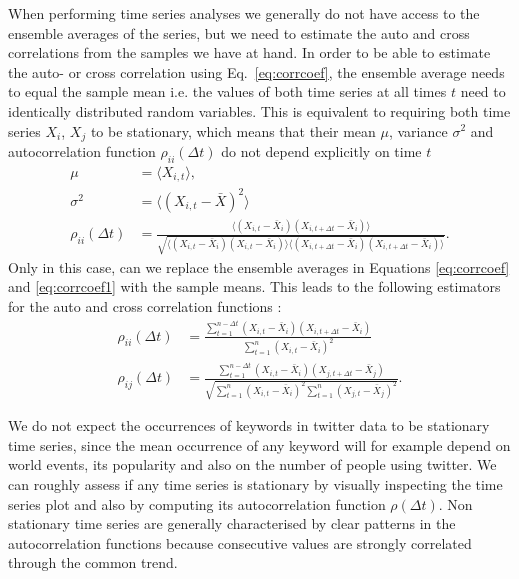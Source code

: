 \documentclass[12pt, a4paper]{article}
\begin{document}
When performing time series analyses we generally do not have access to the ensemble averages of the series, but we need to estimate the auto and cross correlations from the samples we have at hand. In order to be able to estimate the auto- or cross correlation using Eq.~\ref{eq:corrcoef}, the ensemble average needs to equal the sample mean i.e. the values of both time series at all times $t$ need to identically distributed random variables. This is equivalent to requiring both time series $X_{i}$, $X_{j}$ to be stationary, which means that their mean $\mu$, variance $\sigma^{2}$ and autocorrelation function $\rho_{ii}(\Delta t)$ do not depend explicitly on time $t$
\begin{align}
\mu &= \langle X_{i, t} \rangle, \\
\sigma^{2} &=  \langle (X_{i, t}-\bar{X})^{2} \rangle \\
\rho_{ii}(\Delta t) &= \frac{\langle (X_{i, t}-\bar{X}_{i}) (X_{i, t+\Delta t}-\bar{X}_{i}) \rangle}{\sqrt{\langle (X_{i, t}-\bar{X}_{i}) (X_{i, t}-\bar{X}_{i}) \rangle \langle (X_{i, t+\Delta t}-\bar{X}_{i}) (X_{i, t+\Delta t}-\bar{X}_{i}) \rangle}}. 
\end{align} 
Only in this case, can we replace the ensemble averages in Equations \ref{eq:corrcoef} and \ref{eq:corrcoef1} with the sample means. This leads to the following estimators for the auto and cross correlation functions \cite{dettling14}:
\begin{align}
\rho_{ii}(\Delta t) &= \frac{\sum_{t=1}^{n-\Delta t} (X_{i, t}-\bar{X}_{i}) (X_{i, t+\Delta t}-\bar{X}_{i})}{\sum_{t=1}^{n} (X_{i, t}-\bar{X}_{i})^{2}} \\
\rho_{ij}(\Delta t) &= \frac{\sum_{t=1}^{n-\Delta t} (X_{i, t}-\bar{X}_{i}) (X_{j, t+\Delta t}-\bar{X}_{j})}{\sqrt{\sum_{t=1}^{n} (X_{i, t}-\bar{X}_{i})^{2}\sum_{t=1}^{n} (X_{j, t}-\bar{X}_{j})^{2}}}.
\end{align} 

We do not expect the occurrences of keywords in twitter data to be stationary time series, since the mean occurrence of any keyword will for example depend on world events, its popularity and also on the number of people using twitter. We can roughly assess if any time series is stationary by visually inspecting the time series plot and also by computing its autocorrelation function $\rho(\Delta t)$. Non stationary time series are generally characterised by clear patterns in the autocorrelation functions because consecutive values are strongly correlated through the common trend.
\end{document}
